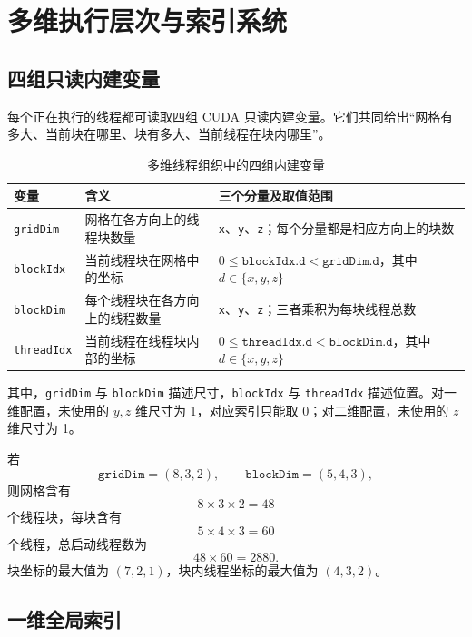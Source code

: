 \section{多维执行层次与索引系统}

\subsection{四组只读内建变量}

每个正在执行的线程都可读取四组 CUDA 只读内建变量。它们共同给出“网格有多大、当前块在哪里、块有多大、当前线程在块内哪里”。

\begin{table}[H]
\centering
\caption{多维线程组织中的四组内建变量}
\begin{tabularx}{\textwidth}{>{\ttfamily}l >{\raggedright\arraybackslash}p{} X}
\toprule
变量 & 含义 & 三个分量及取值范围 \\
\midrule
\normalfont\texttt{gridDim} & 网格在各方向上的线程块数量 & \texttt{x}、\texttt{y}、\texttt{z}；每个分量都是相应方向上的块数 \\
\normalfont\texttt{blockIdx} & 当前线程块在网格中的坐标 & $0\leq\texttt{blockIdx.d}<\texttt{gridDim.d}$，其中 $d\in\{x,y,z\}$ \\
\normalfont\texttt{blockDim} & 每个线程块在各方向上的线程数量 & \texttt{x}、\texttt{y}、\texttt{z}；三者乘积为每块线程总数 \\
\normalfont\texttt{threadIdx} & 当前线程在线程块内部的坐标 & $0\leq\texttt{threadIdx.d}<\texttt{blockDim.d}$，其中 $d\in\{x,y,z\}$ \\
\bottomrule
\end{tabularx}
\end{table}

其中，\texttt{gridDim} 与 \texttt{blockDim} 描述尺寸，\texttt{blockIdx} 与 \texttt{threadIdx} 描述位置。对一维配置，未使用的 $y,z$ 维尺寸为 1，对应索引只能取 0；对二维配置，未使用的 $z$ 维尺寸为 1。

\begin{examplebox}[title=三维尺寸示例]
若
\[
\texttt{gridDim}=(8,3,2),\qquad \texttt{blockDim}=(5,4,3),
\]
则网格含有
\[
8\times 3\times 2=48
\]
个线程块，每块含有
\[
5\times 4\times 3=60
\]
个线程，总启动线程数为
\[
48\times 60=2880.
\]
块坐标的最大值为 $(7,2,1)$，块内线程坐标的最大值为 $(4,3,2)$。
\end{examplebox}

\subsection{一维全局索引}

